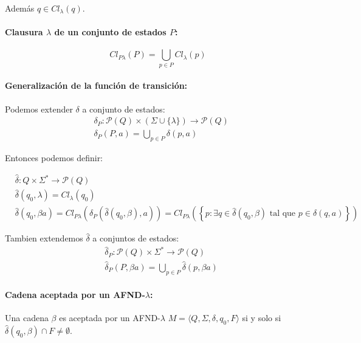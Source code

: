 Además \(q\in Cl_\lambda(q)\).

\paragraph{Clausura \(\lambda\) de un conjunto de estados \(P\):} \[Cl_{P\lambda}(P) = \bigcup_{p\in P} Cl_\lambda(p)\]
\paragraph{Generalización de la función de transición:}
Podemos extender \(\delta\) a conjunto de estados:
\begin{align*}
   & \delta_P: \mathcal{P}(Q) \times (\Sigma \cup \{\lambda\}) \to \mathcal{P}(Q) \\
   & \delta_P(P,a) = \underset{p\in P}{\bigcup} \delta(p,a)
\end{align*}

Entonces podemos definir:

\begin{align*}
   & \hat\delta: Q \times \Sigma^* \to \mathcal{P}(Q)                                                                                                                                                             \\
   & \hat\delta(q_0,\lambda) = Cl_\lambda(q_0)                                                                                                                                                                    \\
   & \hat\delta(q_0, \beta a) = Cl_{P\lambda}\left(\delta_P(\hat\delta(q_0,\beta), a)\right) = Cl_{P\lambda}\left(\left\{ p: \exists q\in \hat\delta(q_0,\beta) \text{ tal que } p\in \delta(q,a) \right\}\right)
\end{align*}

Tambien extendemos \(\hat\delta\) a conjuntos de estados:
\begin{align*}
   & \hat\delta_P: \mathcal{P}(Q) \times \Sigma^* \to \mathcal{P}(Q)  \\
   & \hat\delta_P(P,\beta a) = \bigcup_{p\in P} \hat\delta(p,\beta a)
\end{align*}

\paragraph{Cadena aceptada por un AFND-\(\lambda\):} Una cadena \(\beta\) es aceptada por un AFND-\(\lambda\) \(M =\langle Q,\Sigma,\delta,q_0,F\rangle\) si y solo si \(\hat\delta(q_0,\beta)\cap F \neq \emptyset\).

